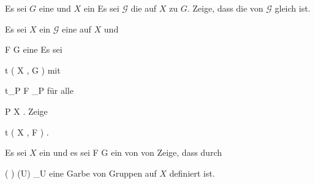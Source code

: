 {}
{





Es sei $G$ eine
und $X$ ein
Es sei ${ \mathcal  G   }$ die
auf $X$ zu $G$. Zeige, dass die
von ${ \mathcal  G   }$ gleich
 ist.





}
{} {}

{}
{





Es sei $X$ ein
${ \mathcal  G   }$ eine
auf $X$ und

\mavergleichskette
{\vergleichskette
{ { \mathcal  F   }
}
{ \subseteq }{ { \mathcal  G   }
}
{  }{
}
{    }{
}
{   }{
}
}
{}{}{}
eine
Es sei

\mavergleichskette
{\vergleichskette
{t
}
{ \in }{ \Gamma   \left(   X ,  { \mathcal  G   }   \right)
}
{  }{
}
{    }{
}
{   }{
}
}
{}{}{}
mit

\mavergleichskette
{\vergleichskette
{t_P
}
{ \in }{ { \mathcal  F   }_P
}
{  }{
}
{    }{
}
{   }{
}
}
{}{}{}
für alle

\mavergleichskette
{\vergleichskette
{P
}
{ \in }{ X
}
{  }{
}
{    }{
}
{   }{
}
}
{}{}{.}
Zeige

\mavergleichskette
{\vergleichskette
{t
}
{ \in }{ \Gamma   \left(   X ,  { \mathcal  F   }   \right)
}
{  }{
}
{    }{
}
{   }{
}
}
{}{}{.}





}
{} {}

{}
{





Es sei $X$ ein
und es sei
\maabb {\varphi} { { \mathcal  F   } } { { \mathcal  G   }
} {}
ein
von
von
Zeige, dass durch

\mavergleichskette
{\vergleichskette
{ \left(   \varphi  \right)  (U)
}
{  }{  \varphi_U
}
{  }{
}
{    }{
}
{   }{
}
}
{}{}{}
eine Garbe von Gruppen auf $X$ definiert ist.





}
{} {}

